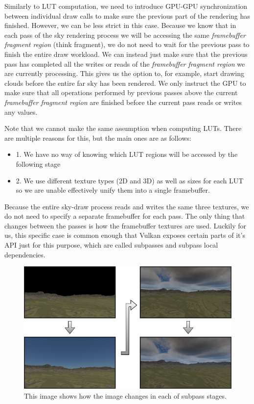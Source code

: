 \documentclass{ctuthesis}
\begin{document}
Similarly to LUT computation, we need to introduce GPU-GPU synchronization between individual
draw calls to make sure the previous part of the rendering has finished. However, we can be less strict
in this case. Because we know that in each pass of the sky rendering process we will be accessing the 
same \textit{framebuffer fragment region} (think fragment), we do not need to wait for the previous pass to finish 
the entire draw workload. We can instead just make sure that the previous pass has completed all the 
writes or reads of the \textit{framebuffer fragment region} we are currently processing. This gives
us the option to, for example, start drawing clouds before the entire far sky has been rendered.
We only instruct the GPU to make sure that all operations performed by previous passes above the current
\textit{framebuffer fragment region} are finished before the current pass reads or writes any values.

Note that we cannot make the same assumption when computing LUTs. There are multiple reasons for this, 
but the main ones are as follows:
\begin{itemize}
    \item 1. We have no way of knowing which LUT regions will be accessed by the following stage
    \item 2. We use different texture types (2D and 3D) as well as sizes for each LUT so we 
             are unable effectively unify them into a single framebuffer.
\end{itemize}

Because the entire sky-draw process reads and writes the same three textures, we do not need to specify a
separate framebuffer for each pass. The only thing that changes between the passes is how the framebuffer
textures are used. Luckily for us, this specific case is common enough that Vulkan exposes certain parts
of it's API just for this purpose, which are called subpasses and subpass local dependencies.

\begin{figure}
    \includegraphics[width=1.0\textwidth]{media/Supass_process.png}
    \caption[Subpass stage changes visualization]{ This image shows how the image changes in each of subpass stages.}
    \label{fig:subpass process}
\end{figure}
\end{document}
